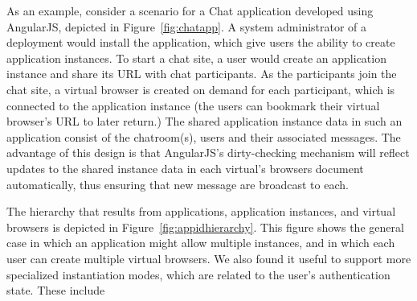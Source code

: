 \chatappfig{}
As an example, consider a scenario for a Chat application developed using AngularJS, 
depicted in Figure~\ref{fig:chatapp}.
A system administrator of a \cb deployment would install the application, which give users the
ability to create application instances. To start a chat site, a user would create
an application instance and share its URL with chat participants.  As the participants join
the chat site, a virtual browser is created on demand for each participant, which is connected 
to the application instance (the users can bookmark their virtual browser's URL to later return.)
The shared application instance data in such an application 
consist of the chatroom(s), users and their associated messages.  The advantage of this design 
is that AngularJS's dirty-checking mechanism will reflect updates to the shared instance data 
in each virtual's browsers document automatically, thus ensuring that new message are broadcast 
to each.

The hierarchy that results from applications, application instances, and virtual browsers is
depicted in Figure~\ref{fig:appidhierarchy}.  This figure shows the general case in which an
application might allow multiple instances, and in which each user can create multiple virtual
browsers.  We also found it useful to support more specialized instantiation modes, which are
related to the user's authentication state.   These include

